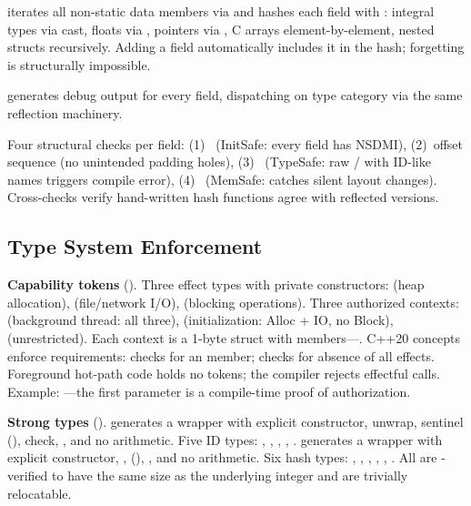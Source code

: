  iterates all non-static data members via  and hashes each field with : integral types via cast, floats via , pointers via , C arrays element-by-element, nested structs recursively.
Adding a field automatically includes it in the hash; forgetting is structurally impossible.

 generates debug output for every field, dispatching on type category via the same reflection machinery.

Four structural checks per field:
(1)~ (InitSafe: every field has NSDMI),
(2)~offset sequence (no unintended padding holes),
(3)~ (TypeSafe: raw / with ID-like names triggers compile error),
(4)~ (MemSafe: catches silent layout changes).
Cross-checks verify hand-written hash functions agree with reflected versions.

\subsection{Type System Enforcement}

\textbf{Capability tokens} ().
Three effect types with private constructors:  (heap allocation),  (file/network I/O),  (blocking operations).
Three authorized contexts:  (background thread: all three),  (initialization: Alloc + IO, no Block),  (unrestricted).
Each context is a 1-byte struct with  members---.
C++20 concepts enforce requirements:  checks for an  member;  checks for absence of all effects.
Foreground hot-path code holds no tokens; the compiler rejects effectful calls.
Example: ---the first parameter is a compile-time proof of authorization.

\textbf{Strong types} ().
 generates a  wrapper with explicit constructor,  unwrap,  sentinel (),  check, , and no arithmetic.
Five ID types: , , , , .
 generates a  wrapper with explicit constructor, ,  (), , and no arithmetic.
Six hash types: , , , , , .
All are -verified to have the same size as the underlying integer and are trivially relocatable.

